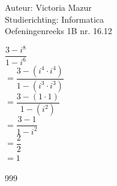 \documentclass[a4paper]{article}
\begin{document}
  
\noindent \large Auteur: Victoria Mazur \\
\noindent \large Studierichting: Informatica\\
\noindent \large Oefeningenreeks 1B nr. 16.12\\

\medskip

\normalsize

$\dfrac{3 - i^8}{1 - i^6}$ \\

$= \dfrac{3 - \left(i^4 \cdot i^4\right)}{1 - \left(i^3 \cdot i^3\right)}$ \\

$= \dfrac{3 - \left(1 \cdot 1 \right)}{1 - \left(i^2 \right)}$ \\

$= \dfrac{3 - 1}{1 - i^2}$ \\

$= \dfrac{2}{2}$ \\

$= 1$
 
\begin{thebibliography}{999}
\end{thebibliography}
\end{document}
